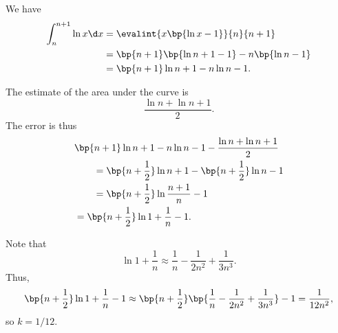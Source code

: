 \begin{solution}
    \begin{ppart}
        We have
        \begin{align*}
            \int_{n}^{n+1} \ln x \d x &= \evalint{x\bp{\ln x- 1}}{n}{n+1}\\
            &= \bp{n+1} \bp{\ln{n+1} - 1} - n \bp{\ln n - 1}\\
            &= \bp{n+1} \ln{n+1} - n \ln n - 1.
        \end{align*}
    \end{ppart}
    \begin{ppart}
        The estimate of the area under the curve is \[\frac{\ln n + \ln{n+1}}2.\] The error is thus
        \begin{align*}
            &\bp{n+1} \ln{n+1} - n \ln n - 1 - \frac{\ln n + \ln{n+1}}{2}\\
            &\hspace{2em}= \bp{n + \frac12} \ln{n+1} - \bp{n + \frac12} \ln n - 1\\
            &\hspace{2em}= \bp{n + \frac12} \ln{\frac{n+1}{n}} - 1\\
            &= \bp{n+\frac12} \ln{1 + \frac1n} - 1.
        \end{align*}
    \end{ppart}
    \begin{ppart}
        Note that \[\ln{1 + \frac1n} \approx \frac1n - \frac1{2n^2} + \frac1{3n^3}.\] Thus, \[\bp{n+\frac12} \ln{1 + \frac1n} - 1 \approx \bp{n + \frac12} \bp{\frac1n - \frac1{2n^2} + \frac1{3n^3}} - 1 = \frac1{12 n^2},\] so $k = 1/12$.
    \end{ppart}
\end{solution}